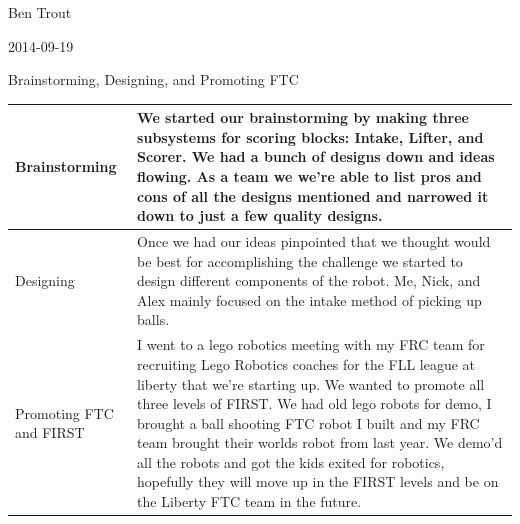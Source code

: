 Ben Trout

2014-09-19

Brainstorming, Designing, and Promoting FTC

\begin{tabular}{|p{5cm}|p{5cm}|}
 \hline
 Brainstorming&
 We started our brainstorming by making three subsystems for scoring blocks:
 Intake, Lifter, and Scorer. We had a bunch of designs down and ideas flowing.
 As a team we we’re able to list pros and cons of all the designs mentioned and narrowed
 it down to just a few quality designs.
 \\
 \hline
 Designing&
 Once we had our ideas pinpointed that we thought would be best for accomplishing
 the challenge we started to design different components of the robot.
 Me, Nick, and Alex mainly focused on the intake method of picking up balls.
 \\
 \hline
 Promoting FTC and FIRST&
 I went to a lego robotics meeting with my FRC team for recruiting Lego Robotics coaches
 for the FLL league at liberty that we’re starting up. We wanted to promote all three
 levels of FIRST. We had old lego robots for demo, I brought a ball shooting FTC robot
 I built and my FRC team brought their worlds robot from last year.
 We demo’d all the robots and got the kids exited for robotics, hopefully they will
 move up in the FIRST levels and be on the Liberty FTC team in the future.
 \\
 \hline
\end{tabular}

